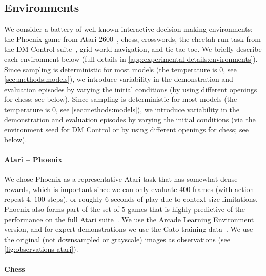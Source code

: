 \subsection{Environments}
\label{sec:methods:environments}

We consider a battery of well-known interactive decision-making environments: the Phoenix game from Atari $2600$~\citep{bellemare2013arcade}, chess, crosswords, the cheetah run task from the DM Control suite~\citep{tassa2018deepmind}, grid world navigation, and tic-tac-toe.
We briefly describe each environment below (full details in \cref{app:experimental-details:environments}).
\ificlr
Since sampling is deterministic for most models (\ie the temperature is $0$, see \cref{sec:methods:models}), we introduce variability in the demonstration and evaluation episodes by varying the initial conditions (\eg by using different openings for chess; see below). 
\else
Since sampling is deterministic for most models (\ie the temperature is $0$, see \cref{sec:methods:models}), we introduce variability in the demonstration and evaluation episodes by varying the initial conditions (\eg via the environment seed for DM Control or by using different openings for chess; see below). 
\fi

\paragraph{Atari -- Phoenix}

We chose Phoenix as a representative Atari task that has somewhat dense rewards, which is important since we can only evaluate $400$ frames (with action repeat $4$, \ie $100$ steps), or roughly $6$ seconds of play due to context size limitations.
Phoenix also forms part of the set of $5$ games that is highly predictive of the performance on the full Atari suite~\citep{aitchison2023atari}.
We use the Arcade Learning Environment~\citep{bellemare2013arcade} version, and for expert demonstrations we use the Gato training data~\citep{reed2022generalist}.
We use the original (\ie not downsampled or grayscale) images as observations (see \cref{fig:observations-atari}).

\paragraph{Chess}

